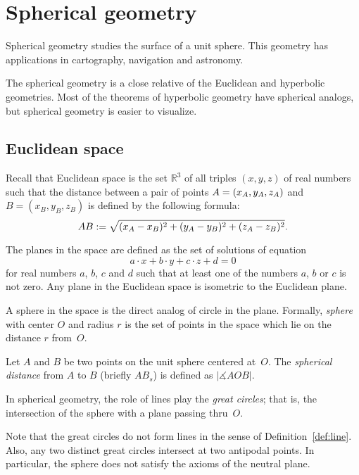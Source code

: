 \chapter{Spherical geometry}
\label{chap:sphere}

Spherical geometry studies the surface of a unit sphere.
This geometry has applications in cartography, navigation  and astronomy.

The spherical geometry is a close relative of the Euclidean and hyperbolic geometries.
Most of the theorems of hyperbolic geometry have spherical analogs,
but spherical geometry is easier to visualize. 

\section*{Euclidean space}

Recall that Euclidean space is the set $\mathbb{R}^3$ of all triples $(x,y,z)$ of real numbers
such that the distance between a pair of points
$A\z=(x_A,y_A,z_A)$ and $B=(x_B,y_B,z_B)$
is defined by the following formula:
$$AB
:=
\sqrt{(x_A-x_B)^2+(y_A-y_B)^2+(z_A-z_B)^2}.$$

The planes in the space are defined as the set of solutions of equation 
$$a\cdot x+b\cdot y+c\cdot z+d=0$$ 
for real numbers $a$, $b$, $c$ and $d$ such that at least one of the numbers $a$, $b$ or $c$ is not zero.
Any plane in the Euclidean space is isometric to the Euclidean plane.

A sphere in the space is the direct analog of circle in the plane.
Formally, \emph{sphere} with center $O$ and radius $r$ is the set of points in the space which lie on the distance $r$ from~$O$.

Let $A$ and $B$ be two points on the unit sphere centered at~$O$.
The \emph{spherical distance} from $A$ to $B$
(briefly $AB_s$)
 is defined as  $|\measuredangle AOB|$. 

In spherical geometry, the role of lines play the \emph{great circles};
that is, the intersection of the sphere with a plane passing thru~$O$.

Note that the great circles do not form lines in the sense of Definition~\ref{def:line}.
Also, any two distinct great circles intersect at two antipodal points.
In particular, the sphere does not satisfy the axioms of the neutral plane.







